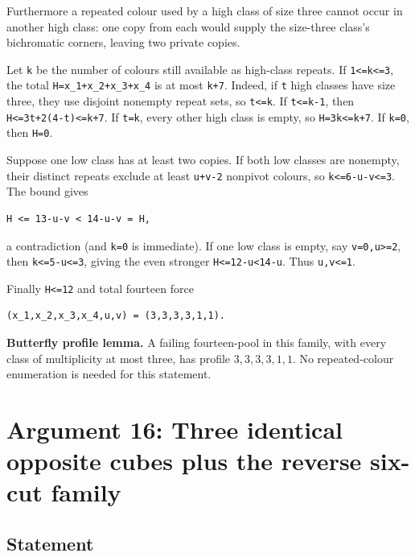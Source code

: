 \documentclass[
  10pt,
]{article}
\begin{document}
Furthermore a repeated colour used by a high class of size three cannot
occur in another high class: one copy from each would supply the
size-three class's bichromatic corners, leaving two private copies.

Let \texttt{k} be the number of colours still available as high-class
repeats. If \texttt{1\textless{}=k\textless{}=3}, the total
\texttt{H=x\_1+x\_2+x\_3+x\_4} is at most \texttt{k+7}. Indeed, if
\texttt{t} high classes have size three, they use disjoint nonempty
repeat sets, so \texttt{t\textless{}=k}. If \texttt{t\textless{}=k-1},
then \texttt{H\textless{}=3t+2(4-t)\textless{}=k+7}. If \texttt{t=k},
every other high class is empty, so \texttt{H=3k\textless{}=k+7}. If
\texttt{k=0}, then \texttt{H=0}.

Suppose one low class has at least two copies. If both low classes are
nonempty, their distinct repeats exclude at least \texttt{u+v-2}
nonpivot colours, so \texttt{k\textless{}=6-u-v\textless{}=3}. The bound
gives

\begin{verbatim}
H <= 13-u-v < 14-u-v = H,
\end{verbatim}

a contradiction (and \texttt{k=0} is immediate). If one low class is
empty, say \texttt{v=0,u\textgreater{}=2}, then
\texttt{k\textless{}=5-u\textless{}=3}, giving the even stronger
\texttt{H\textless{}=12-u\textless{}14-u}. Thus
\texttt{u,v\textless{}=1}.

Finally \texttt{H\textless{}=12} and total fourteen force

\begin{verbatim}
(x_1,x_2,x_3,x_4,u,v) = (3,3,3,3,1,1).
\end{verbatim}

\textbf{Butterfly profile lemma.} A failing fourteen-pool in this
family, with every class of multiplicity at most three, has profile
\(3,3,3,3,1,1\). No repeated-colour enumeration is needed for this
statement.

\hypertarget{arg-16}{%
\section{Argument 16: Three identical opposite cubes plus the reverse
six-cut family}\label{arg-16}}

\hypertarget{statement}{%
\subsection*{Statement}\label{statement}}
\end{document}
